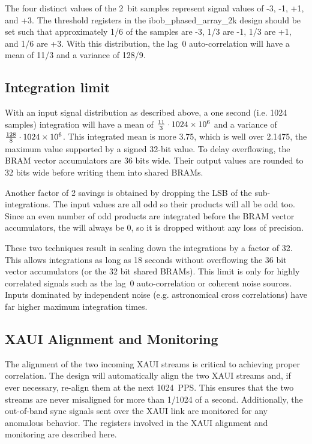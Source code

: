 \documentclass[12pt]{article}
\begin{document}
The four distinct values of the 2~bit samples represent signal values of -3,
-1, +1, and +3.  The threshold registers in the ibob\_phased\_array\_2k design
should be set such that approximately 1/6 of the samples are -3, 1/3 are -1,
1/3 are +1, and 1/6 are +3.  With this distribution, the lag~0 auto-correlation
will have a mean of 11/3 and a variance of 128/9.

\subsection{Integration limit}

With an input signal distribution as described above, a one second (i.e.
1024 samples) integration will have a mean of $\frac{11}{3}\cdot1024\times 10^{6}$ and
a variance of $\frac{128}{8}\cdot1024\times 10^{6}$.  This integrated mean is more
3.75, which is well over 2.1475, the maximum value supported by a signed
32-bit value.  To delay overflowing, the BRAM vector accumulators are 36 bits
wide.  Their output values are rounded to 32 bits wide before writing them into
shared BRAMs.

Another factor of 2 savings is obtained by dropping the LSB of the
sub-integrations.  The input values are all odd so their products will all be
odd too.  Since an even number of odd products are integrated before the BRAM
vector accumulators, the \LSb will always be 0, so it is dropped without any
loss of precision.

These two techniques result in scaling down the integrations by a factor of 32.
This allows integrations as long as 18 seconds without overflowing the 36 bit
vector accumulators (or the 32 bit shared BRAMs).  This limit is only for
highly correlated signals such as the lag~0 auto-correlation or coherent noise
sources.  Inputs dominated by independent noise (e.g. astronomical cross
correlations) have far higher maximum integration times.

\subsection{XAUI Alignment and Monitoring}

The alignment of the two incoming XAUI streams is critical to achieving proper
correlation.  The design will automatically align the two XAUI streams and, if
ever necessary, re-align them at the next 1024~PPS.  This ensures that the two
streams are never misaligned for more than 1/1024 of a second.  Additionally,
the out-of-band sync signals sent over the XAUI link are monitored for any
anomalous behavior.  The registers involved in the XAUI alignment and
monitoring are described here.
\end{document}

